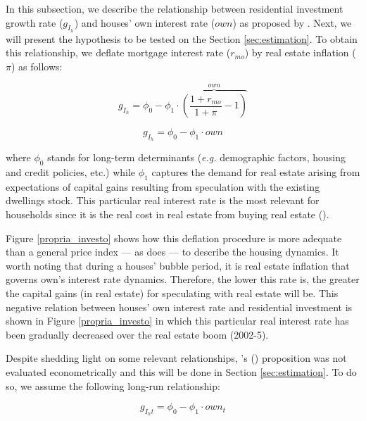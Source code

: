 \documentclass[11pt]{article}
\begin{document}
In this subsection, we describe the relationship between residential investment growth rate (\(g_{I_h}\)) and houses' own interest rate (\(own\)) as proposed by \textcite{teixeira_crescimento_2015}. 
Next, we will present the hypothesis to be tested on the Section \ref{sec:estimation}. To obtain this relationship, we deflate mortgage interest rate (\(r_{mo}\)) by real estate inflation (\(\pi\)) as follows:

$$
g_{I_h} = \phi_0 - \phi_1\cdot \overbrace{\left(\frac{1+r_{mo}}{1+\pi} - 1\right)}^{own}
$$

\begin{equation}
g_{I_h} = \phi_0 - \phi_1\cdot own
\end{equation}

where \(\phi_0\) stands for long-term determinants (\emph{e.g.} demographic factors, housing and credit policies, etc.) while \(\phi_1\) captures the demand for real estate arising from expectations of capital gains resulting from speculation with the existing dwellings stock. 
This particular real interest rate is the most relevant for households since it is the real cost in real estate from buying real estate  (\cite[p.~53]{teixeira_crescimento_2015}).

Figure \ref{propria_investo} shows how this deflation procedure is more adequate than a general price index --- as \textcite[p.~143--6]{fair_macroeconometric_2013} does --- to describe the housing dynamics. It worth noting that during a houses' bubble period, it is real estate inflation that governs own's interest rate dynamics.
Therefore, the lower this rate is, the greater the capital gains (in real estate) for speculating with real estate will be. This negative relation between houses' own interest rate and residential investment is shown in Figure \ref{propria_investo} in which this particular real interest rate has been gradually decreased over the real estate boom (2002-5).

Despite shedding light on some relevant relationships, \citeauthor{teixeira_crescimento_2015}'s (\citeyear{teixeira_crescimento_2015}) proposition was not evaluated econometrically and this will be done in Section \ref{sec:estimation}. To do so, we assume the following long-run relationship:

\begin{equation}
g_{I_ht} = \phi_0 - \phi_1\cdot own_t
\end{equation}
\end{document}
